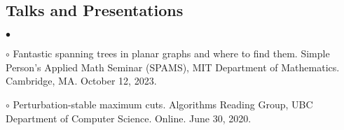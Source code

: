 \documentclass[margin,line]{res}
\newenvironment{list2}{
  \begin{list}{$\bullet$}{%
      \setlength{\itemsep}{0in}
      \setlength{\parsep}{0in} \setlength{\parskip}{0in}
      \setlength{\topsep}{0in} \setlength{\partopsep}{0in}
      \setlength{\leftmargin}{0.2in}}}{\end{list}}
\begin{document}
\begin{resume}
\section{\sc Talks and Presentations}

\begin{list2}
\item[$\circ$] Fantastic spanning trees in planar graphs and where to find them. Simple Person's Applied Math Seminar (SPAMS), MIT Department of Mathematics. Cambridge, MA. October 12, 2023.
\item[$\circ$] Perturbation-stable maximum cuts. Algorithms Reading Group, UBC Department of Computer Science. Online. June 30, 2020.
\end{list2}




\end{resume}
\end{document}
